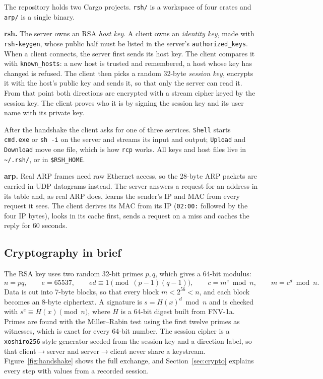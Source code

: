 \documentclass[11pt,a4paper]{article}
\begin{document}
The repository holds two Cargo projects. \texttt{rsh/} is a workspace of four
crates and \texttt{arp/} is a single binary.

\textbf{rsh.} The server owns an RSA \emph{host key}. A client owns an
\emph{identity key}, made with \texttt{rsh-keygen}, whose public half must be
listed in the server's \texttt{authorized\_keys}. When a client connects, the
server first sends its host key. The client compares it with
\texttt{known\_hosts}: a new host is trusted and remembered, a host whose key
has changed is refused. The client then picks a random 32-byte \emph{session
key}, encrypts it with the host's public key and sends it, so that only the
server can read it. From that point both directions are encrypted with a
stream cipher keyed by the session key. The client proves who it is by signing
the session key and its user name with its private key.

After the handshake the client asks for one of three services. \texttt{Shell}
starts \texttt{cmd.exe} or \texttt{sh -i} on the server and streams its input
and output; \texttt{Upload} and \texttt{Download} move one file, which is how
\texttt{rcp} works. All keys and host files live in \texttt{\textasciitilde/.rsh/},
or in \texttt{\$RSH\_HOME}.

\textbf{arp.} Real ARP frames need raw Ethernet access, so the 28-byte ARP
packets are carried in UDP datagrams instead. The server answers a request for
an address in its table and, as real ARP does, learns the sender's IP and MAC
from every request it sees. The client derives its MAC from its IP
(\texttt{02:00:} followed by the four IP bytes), looks in its cache first, sends
a request on a miss and caches the reply for 60 seconds.



\subsection{Cryptography in brief}

The RSA key uses two random 32-bit primes $p, q$, which gives a 64-bit modulus:
\[
  n = pq, \qquad e = 65537, \qquad ed \equiv 1 \pmod{(p-1)(q-1)}, \qquad
  c = m^{e} \bmod n, \qquad m = c^{d} \bmod n.
\]
Data is cut into 7-byte blocks, so that every block $m < 2^{56} < n$, and each
block becomes an 8-byte ciphertext. A signature is $s = H(x)^{d} \bmod n$ and is
checked with $s^{e} \equiv H(x) \pmod n$, where $H$ is a 64-bit digest built
from FNV-1a. Primes are found with the Miller--Rabin test using the first twelve
primes as witnesses, which is exact for every 64-bit number. The session cipher
is a \texttt{xoshiro256}-style generator seeded from the session key and a
direction label, so that client$\to$server and server$\to$client never share a
keystream. Figure~\ref{fig:handshake} shows the full exchange, and
Section~\ref{sec:crypto} explains every step with values from a recorded
session.
\end{document}
